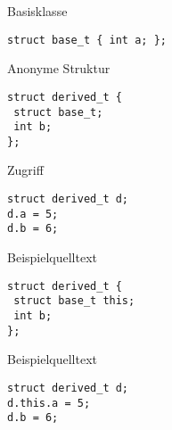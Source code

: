 
\inputminted{C}{code/employees/employee.h}





\begin{code}
\caption{Basisklasse}
\begin{verbatim}
struct base_t { int a; };
\end{verbatim}
\end{code}

\begin{code}
\caption{Anonyme Struktur}
\begin{verbatim}
struct derived_t {
 struct base_t;
 int b;
};
\end{verbatim}
\end{code}

\begin{code}
\caption{Zugriff}
\begin{verbatim}
struct derived_t d;
d.a = 5;
d.b = 6;
\end{verbatim}
\end{code}

\begin{code}
\caption{Beispielquelltext}
\begin{verbatim}
struct derived_t {
 struct base_t this;
 int b;
};
\end{verbatim}
\end{code}

\begin{code}
\caption{Beispielquelltext}
\begin{verbatim}
struct derived_t d;
d.this.a = 5;
d.b = 6;
\end{verbatim}
\end{code}
